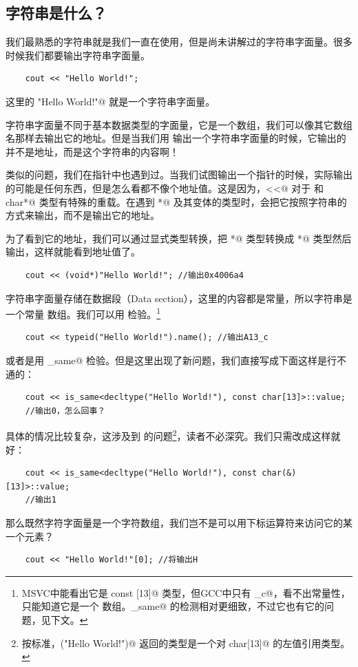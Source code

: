 \subsection*{字符串是什么？}
我们最熟悉的字符串就是我们一直在使用，但是尚未讲解过的字符串字面量。很多时候我们都要输出字符串字面量。
\begin{lstlisting}
    cout << "Hello World!";
\end{lstlisting}
这里的 \lstinline@"Hello World!"@ 就是一个字符串字面量。\par
字符串字面量不同于基本数据类型的字面量，它是一个数组，我们可以像其它数组名那样去输出它的地址。但是当我们用 \lstinline@cout@ 输出一个字符串字面量的时候，它输出的并不是地址，而是这个字符串的内容啊！\par
类似的问题，我们在指针中也遇到过。当我们试图输出一个指针的时候，实际输出的可能是任何东西，但是怎么看都不像个地址值。这是因为，\lstinline@<<@ 对于 \lstinline@ostream@ 和 \lstinline@const char*@ 类型有特殊的重载。在遇到 \lstinline@char*@ 及其变体的类型时，会把它按照字符串的方式来输出，而不是输出它的地址。\par
为了看到它的地址，我们可以通过显式类型转换，把 \lstinline@char*@ 类型转换成 \lstinline@void*@ 类型然后输出，这样就能看到地址值了。
\begin{lstlisting}
    cout << (void*)"Hello World!"; //输出0x4006a4
\end{lstlisting}
字符串字面量存储在数据段（Data section），这里的内容都是常量，所以字符串是一个常量 \lstinline@char@ 数组。我们可以用 \lstinline@typeid@ 检验。\footnote{MSVC中能看出它是 \lstinline@char const [13]@ 类型，但GCC中只有 _c@，看不出常量性，只能知道它是一个 \lstinline@char@ 数组。\lstinline@is_same@ 的检测相对更细致，不过它也有它的问题，见下文。}
\begin{lstlisting}
    cout << typeid("Hello World!").name(); //输出A13_c
\end{lstlisting}
或者是用 \lstinline@is_same@ 检验。但是这里出现了新问题，我们直接写成下面这样是行不通的：
\begin{lstlisting}
    cout << is_same<decltype("Hello World!"), const char[13]>::value;
    //输出0，怎么回事？
\end{lstlisting}
具体的情况比较复杂，这涉及到 \lstinline@decltype@ 的问题\footnote{按标准，\lstinline@decltype("Hello World!")@ 返回的类型是一个对 \lstinline@const char[13]@ 的左值引用类型。}，读者不必深究。我们只需改成这样就好：
\begin{lstlisting}
    cout << is_same<decltype("Hello World!"), const char(&)[13]>::value;
    //输出1
\end{lstlisting}
那么既然字符字面量是一个字符数组，我们岂不是可以用下标运算符来访问它的某一个元素？
\begin{lstlisting}
    cout << "Hello World!"[0]; //将输出H
\end{lstlisting}\par
